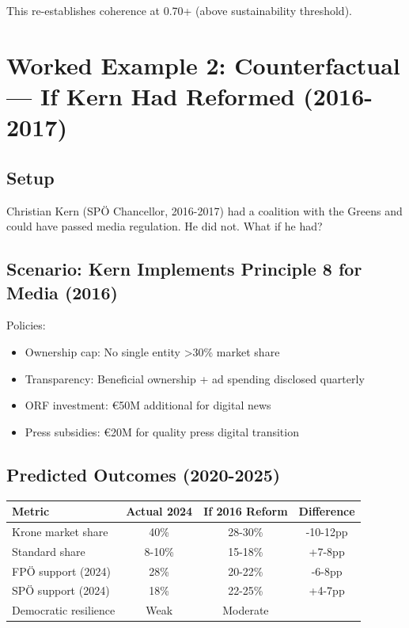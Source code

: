 This re-establishes coherence at 0.70+ (above sustainability threshold).


\section{Worked Example 2: Counterfactual — If Kern Had Reformed (2016-2017)}

\subsection{Setup}

Christian Kern (SPÖ Chancellor, 2016-2017) had a coalition with the Greens and could have passed media regulation. He did not. What if he had?

\subsection{Scenario: Kern Implements Principle 8 for Media (2016)}

Policies:
\begin{itemize}
\item Ownership cap: No single entity >30\% market share
\item Transparency: Beneficial ownership + ad spending disclosed quarterly
\item ORF investment: €50M additional for digital news
\item Press subsidies: €20M for quality press digital transition
\end{itemize}

\subsection{Predicted Outcomes (2020-2025)}

\begin{table}[h]
\centering
\small
\renewcommand{\arraystretch}{1.3}
\begin{tabular}{@{}lccc@{}}
\toprule
\textbf{Metric} & \textbf{Actual 2024} & \textbf{If 2016 Reform} & \textbf{Difference} \\
\midrule
Krone market share & 40\% & 28-30\% & -10-12pp \\
Standard share & 8-10\% & 15-18\% & +7-8pp \\
FPÖ support (2024) & 28\% & 20-22\% & -6-8pp \\
SPÖ support (2024) & 18\% & 22-25\% & +4-7pp \\
Democratic resilience & Weak & Moderate & \\
\bottomrule
\end{tabular}
\end{table}

